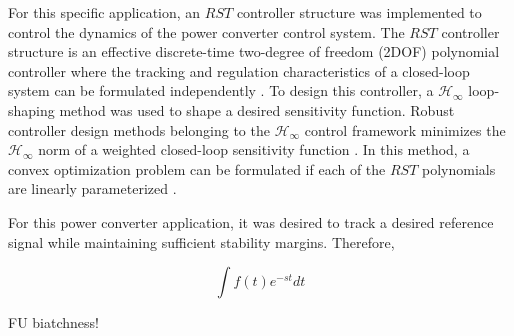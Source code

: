 \documentclass[11pt,english]{article}
\begin{document}
For this specific application, an $RST$ controller structure was implemented to control the dynamics of the power converter control system. The $RST$ controller structure is an effective discrete-time two-degree of freedom (2DOF) polynomial controller where the tracking and regulation characteristics of a closed-loop system can be formulated independently \cite{LZ06}. To design this controller, a $\mathcal{H}_\infty$ loop-shaping method was used to shape a desired sensitivity function. Robust controller design methods belonging to the $\mathcal{H}_{\infty}$ control framework minimizes the $\mathcal{H}_{\infty}$ norm of a weighted closed-loop sensitivity function \cite{ZD98}. In this method, a convex optimization problem can be formulated if each of the $RST$ polynomials are linearly parameterized \cite{NEK15}. 

For this power converter application, it was desired to track a desired reference signal while maintaining sufficient stability margins. Therefore, 

\begin{equation}
\int f(t)e^{-st}dt
\end{equation}

FU biatchness!

\end{document}
